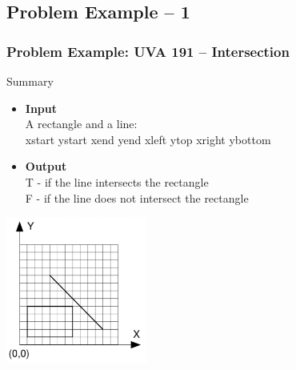 \documentclass{beamer}
\begin{document}
\subsection{Problem Example -- 1}
\begin{frame}
  \frametitle{Problem Example: UVA 191 -- Intersection}

  {\small
    \begin{block}{Summary}
      \begin{itemize}
      \item {\bf Input}\\
        A rectangle and a line:\\
        xstart ystart xend yend xleft ytop xright ybottom

      \item {\bf Output}\\
        T - if the line intersects the rectangle\\
        F - if the line does not intersect the rectangle\\
      \end{itemize}
    \end{block}

    \includegraphics[width=0.35\textwidth]{img/intersection_uva}
    }
\end{frame}
\end{document}
